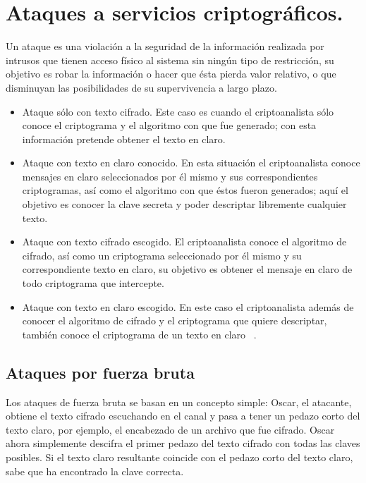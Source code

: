 \section{Ataques a servicios criptográficos.}
Un ataque es una violación a la seguridad de la información realizada por intrusos que tienen acceso físico al sistema sin ningún tipo de restricción, su objetivo es robar la información o hacer que ésta pierda valor relativo, o que disminuyan las posibilidades de su supervivencia a largo plazo.\\
\begin{itemize}
\item Ataque sólo con texto cifrado. Este caso es cuando el criptoanalista sólo conoce el criptograma y el algoritmo con que fue generado; con esta información pretende obtener el texto en claro.
\item Ataque con texto en claro conocido. En esta situación el criptoanalista conoce mensajes en claro seleccionados por él mismo y sus correspondientes criptogramas, así como el algoritmo con que éstos fueron generados; aquí el objetivo es conocer la clave
secreta y poder descriptar libremente cualquier texto. 
\item Ataque con texto cifrado escogido. El criptoanalista conoce el algoritmo de cifrado, así como un criptograma seleccionado por él mismo y su correspondiente texto en claro, su objetivo es obtener el mensaje en claro de todo criptograma que intercepte.
\item Ataque con texto en claro escogido. En este caso el criptoanalista además de conocer el algoritmo de cifrado y el criptograma que quiere descriptar, también conoce el criptograma de un texto en claro ~\cite{ataques}.
\end{itemize} 

\subsection{Ataques por fuerza bruta}

Los ataques de fuerza bruta se basan en un concepto simple: Oscar, el atacante, obtiene el texto cifrado escuchando en el canal y pasa a tener un pedazo corto del texto claro, por ejemplo, el encabezado de un archivo que fue cifrado. Oscar ahora simplemente descifra el primer pedazo del texto cifrado con todas las claves posibles. Si el texto claro resultante coincide con el pedazo corto del texto claro, sabe que ha encontrado la clave correcta.\\

